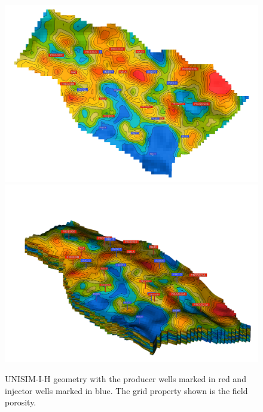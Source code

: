\documentclass[final,5p,times,twocolumn]{elsarticle}
\begin{document}

\begin{figure}[H]
  \centering
  \includegraphics[width=0.85\columnwidth]{Geresim(0010).png}
  \includegraphics[width=0.85\columnwidth]{Geresim(0007).png}
  \caption{UNISIM-I-H geometry with the producer wells marked in red and injector wells marked in blue. The grid property shown is the field porosity.}
  \label{fig:unisim-sample}
\end{figure}
\end{document}
